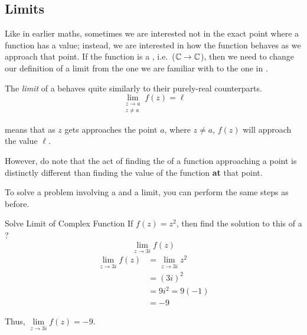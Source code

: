 \subsection{Limits}\label{subsec:Limits}
Like in earlier maths, sometimes we are interested not in the exact point where a function has a value; instead, we are interested in how the function behaves as we approach that point.
If the function is a , i.e.\ ($\operatorname{\mathbb{C}} \to \operatorname{\mathbb{C}}$), then we need to change our definition of a limit from the one we are familiar with to the one in .

\begin{definition}[Limit]\label{def:Complex_Limit}
  The \emph{limit} of a  behaves quite similarly to their purely-real counterparts.
  \begin{equation}\label{eq:Complex_Limit}
    \lim\limits_{\substack{z \to a \\ z \neq a}} f(z) = \ell
  \end{equation}

   means that as $z$ gets approaches the point $a$, where $z \neq a$, $f(z)$ will approach the value $\ell$.

  \begin{remark}\label{rmk:Solving_Limit_Function}
    However, do note that the act of finding the  of a function approaching a point is distinctly different than finding the value of the function \textbf{at} that point.
  \end{remark}
\end{definition}

To solve a problem involving a  and a limit, you can perform the same steps as before.

\begin{example}[Lecture 5]{Solve Limit of Complex Function}
  If $f(z) = z^{2}$, then find the solution to this  of a ?
  \begin{equation*}
    \lim\limits_{z \to 3i} f(z)
  \end{equation*}
  \tcblower{}
  \begin{align*}
    \lim\limits_{z \to 3i} f(z) &= \lim\limits_{z \to 3i} z^{2} \\
                                &= {(3i)}^{2} \\
                                &= 9 i^{2} = 9 (-1) \\
                                &= -9
  \end{align*}

  Thus, $\lim\limits_{z \to 3i} f(z) = -9$.
\end{example}

